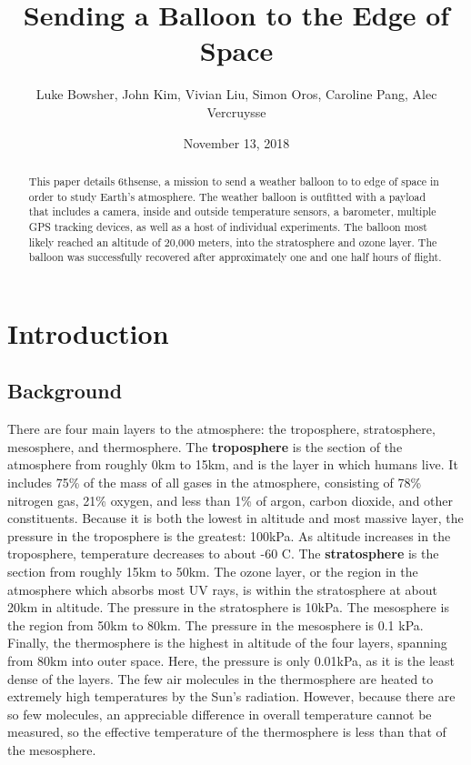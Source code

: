 \documentclass[12pt,]{article}
\title{Sending a Balloon to the Edge of Space}
\author{Luke Bowsher, John Kim, Vivian Liu, Simon Oros, Caroline Pang, Alec
Vercruysse}
\date{November 13, 2018}
\begin{document}
\maketitle
\begin{abstract}
This paper details 6thsense, a mission to send a weather balloon to to
edge of space in order to study Earth's atmosphere. The weather balloon
is outfitted with a payload that includes a camera, inside and outside
temperature sensors, a barometer, multiple GPS tracking devices, as well
as a host of individual experiments. The balloon most likely reached an
altitude of 20,000 meters, into the stratosphere and ozone layer. The
balloon was successfully recovered after approximately one and one half
hours of flight.
\end{abstract}

\newpage

\setcounter{secnumdepth}{3} \setcounter{tocdepth}{3} \tableofcontents
\newpage
\onehalfspacing

\section{Introduction}\label{introduction}

\subsection{Background}\label{background}

There are four main layers to the atmosphere: the troposphere,
stratosphere, mesosphere, and thermosphere. The \textbf{troposphere} is
the section of the atmosphere from roughly 0km to 15km, and is the layer
in which humans live. It includes 75\% of the mass of all gases in the
atmosphere, consisting of 78\% nitrogen gas, 21\% oxygen, and less than
1\% of argon, carbon dioxide, and other constituents. Because it is both
the lowest in altitude and most massive layer, the pressure in the
troposphere is the greatest: 100kPa. As altitude increases in the
troposphere, temperature decreases to about -60 \degree C. The
\textbf{stratosphere} is the section from roughly 15km to 50km. The
ozone layer, or the region in the atmosphere which absorbs most UV rays,
is within the stratosphere at about 20km in altitude. The pressure in
the stratosphere is 10kPa. The mesosphere is the region from 50km to
80km. The pressure in the mesosphere is 0.1 kPa. Finally, the
thermosphere is the highest in altitude of the four layers, spanning
from 80km into outer space. Here, the pressure is only 0.01kPa, as it is
the least dense of the layers. The few air molecules in the thermosphere
are heated to extremely high temperatures by the Sun's radiation.
However, because there are so few molecules, an appreciable difference
in overall temperature cannot be measured, so the effective temperature
of the thermosphere is less than that of the mesosphere.
\end{document}
